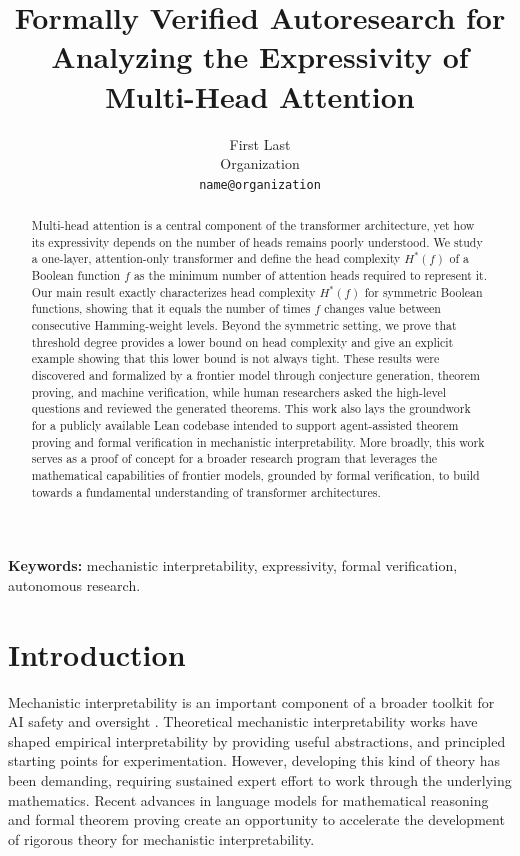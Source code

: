 \documentclass{article}
\title{Formally Verified Autoresearch for Analyzing the Expressivity of Multi-Head Attention}
\author{%
  First Last \\
  Organization \\
  \texttt{name@organization} \\
}
\theoremstyle{definition}
\theoremstyle{plain}
\begin{document}
\maketitle

\begin{abstract}
Multi-head attention is a central component of the transformer architecture, yet how its expressivity depends on the number of heads remains poorly understood. We study a one-layer, attention-only transformer and define the head complexity $H^\ast(f)$ of a Boolean function $f$ as the minimum number of attention heads required to represent it. Our main result exactly characterizes head complexity $H^\ast(f)$ for symmetric Boolean functions, showing that it equals the number of times $f$ changes value between consecutive Hamming-weight levels. Beyond the symmetric setting, we prove that threshold degree provides a lower bound on head complexity and give an explicit example showing that this lower bound is not always tight. These results were discovered and formalized by a frontier model through conjecture generation, theorem proving, and machine verification, while human researchers asked the high-level questions and reviewed the generated theorems. This work also lays the groundwork for a publicly available Lean codebase intended to support agent-assisted theorem proving and formal verification in mechanistic interpretability. More broadly, this work serves as a proof of concept for a broader research program that leverages the mathematical capabilities of frontier models, grounded by formal verification, to build towards a fundamental understanding of transformer architectures.
\end{abstract}

\noindent\textbf{Keywords:} mechanistic interpretability, expressivity, formal verification, autonomous research.

\section{Introduction}
\label{sec:introduction}

Mechanistic interpretability is an important component of a broader toolkit for AI safety and oversight \cite{ISRSAA2026}. Theoretical mechanistic interpretability works \cite{elhage2021mathematical, elhage2022toymodelssuperposition, geshkovski2025mathematicalperspectivetransformers} have shaped empirical interpretability \cite{olsson2022incontextlearninginductionheads, cunningham2023sparseautoencodershighlyinterpretable, viswanathan2026the} by providing useful abstractions, and principled starting points for experimentation. However, developing this kind of theory has been demanding, requiring sustained expert effort to work through the underlying mathematics. Recent advances in language models for mathematical reasoning and formal theorem proving \cite{tsoukalas2026advancingmathematicsresearchaidriven, alon2026remarksdisproofunitdistance, yang2023leandojo} create an opportunity to accelerate the development of rigorous theory for mechanistic interpretability.
\end{document}
